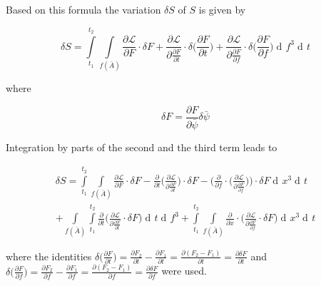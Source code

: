 \documentclass{article}
\DeclareMathOperator{\dd}{d\!}
\begin{document}
Based on this formula the variation $\delta S$ of $S$ is given by

\begin{equation}
\delta S = \int\limits_{t_1}^{t_2} \int\limits_{f(\bar{A})} 
\frac{\partial \mathcal{L}}{\partial F} \cdot \delta F
+ \frac{\partial \mathcal{L}}{\partial \frac{\partial F}{\partial t}} \cdot \delta \bigg(\frac{\partial F}{\partial t}\bigg)
+ \frac{\partial \mathcal{L}}{\partial \frac{\partial F}{\partial f}} \cdot \delta \bigg(\frac{\partial F} {\partial f}\bigg)
\dd f^3 \dd t
\end{equation}

where 

\begin{equation} \label{deltaFDefinition}
\delta F = \frac{\partial F}{\partial \bar{\psi}} \delta \bar{\psi}
\end{equation}


Integration by parts of the second and the third term leads to

\begin{equation} \label{calcDeltaSSection3}
\begin{split}
\delta S = \int\limits_{t_1}^{t_2} \int\limits_{f(\bar{A})} 
\frac{\partial \mathcal{L}}{\partial F} \cdot \delta F
-\frac{\partial}{\partial t} \bigg( \frac{\partial \mathcal{L}}{\partial \frac{\partial F}{\partial t}} \bigg) \cdot \delta F
-\bigg(\frac{\partial}{\partial f} \cdot \bigg( \frac{\partial \mathcal{L}}{\partial \frac{\partial F}{\partial f}} \bigg)\bigg) \cdot \delta F
\dd x^3 \dd t \\
+ \int\limits_{f(\bar{A})} \int\limits_{t_1}^{t_2} \frac{\partial}{\partial t} \bigg(\frac{\partial \mathcal{L}}{\partial \frac{\partial F}{\partial t}} \cdot \delta F \bigg) \dd t \dd f^3
+ \int\limits_{t_1}^{t_2} 
\int\limits_{f(\bar{A})} \frac{\partial}{\partial x} \cdot \bigg( \frac{\partial \mathcal{L}}{\partial \frac{\partial F}{\partial f}} \cdot \delta F \bigg) \dd x^3 \dd t
\end{split}
\end{equation}

where the identities $\delta \bigg(\frac{\partial F} {\partial t}\bigg) 
= \frac{\partial F_2} {\partial t} - \frac{\partial F_1} {\partial t}
= \frac{\partial (F_2 - F_1)} {\partial t}
= \frac{\partial \delta F} {\partial t}$ 
and
$\delta \bigg(\frac{\partial F} {\partial f}\bigg) 
= \frac{\partial F_2} {\partial f} - \frac{\partial F_1} {\partial f}
= \frac{\partial (F_2 - F_1)} {\partial f}
= \frac{\partial \delta F} {\partial f}$ 
were used. \\
\end{document}
